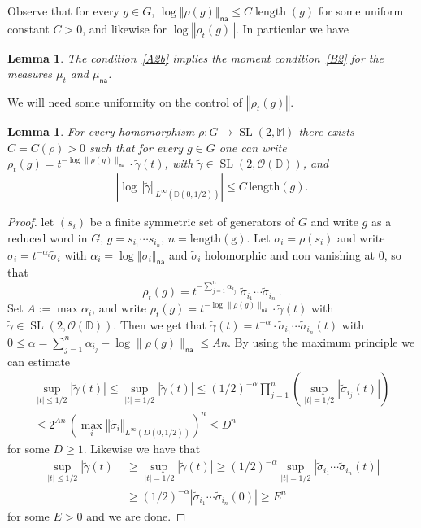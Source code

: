 \documentclass[11pt]{article}
\newtheorem{lemm}[theo]{Lemma}
\theoremstyle{definition}
\numberwithin{equation}{section}
\numberwithin{figure}{section}
\numberwithin{table}{section}
\DeclareMathOperator{\length}{length}
\DeclareMathOperator{\SL}{SL}
\newcommand{\cO}{\mathcal{O}}
\newcommand{\mm}{\mathbb{M}}
\newcommand{\D}{\mathbb{D}}
\newcommand{\norm}[1]{\left\Vert#1\right\Vert}
\newcommand{\abs}[1]{\left\vert#1\right\vert}
\newcommand{\lrpar}[1]{\left(#1\right)}
\newcommand{\na}{\mathsf{na}}
\begin{document}
Observe that for every $g\in G$, $\log \norm{\rho(g)}_\na\leq C \length (g)$ for some uniform constant $C>0$, and likewise for $\log\norm{\rho_t(g)}$. In particular we have

\begin{lemm}\label{lem:AtoB}
The condition~\eqref{A2b} implies the moment condition~\eqref{B2} for the measures $\mu_t$ and $\mu_\na$.
\end{lemm}

We will need some uniformity on the control of $\norm{\rho_t(g)}$.

\begin{lemm}\label{lem:uniform disk}
For every homomorphism $\rho: G\to \SL(2, \mm)$ there exists $C = C(\rho)>0$ such that for every $g\in G$ one can write $\rho_t(g) = t^{-\log\|\rho(g) \|_\na}\cdot \widetilde{\gamma}(t)$, with $\widetilde{\gamma}\in \SL(2,\cO(\D))$, and
\begin{equation}\label{eq:uniform disk}
\abs{\log\norm{\widetilde \gamma}_{L^{\infty}(\overline{\D}(0,1/2))} }\leq C\, \mathrm{length}(g).
\end{equation}
\end{lemm}

\begin{proof}
let $(s_i)$ be a finite symmetric set of generators of $G$ and write $g$ as a reduced word in $G$, $g = s_{i_1}\cdots s_{i_n}$, $n = \mathrm{length(g)}$. Let $\sigma_i = \rho(s_i)$ and write $\sigma_i = t^{-\alpha_i} \widetilde \sigma_i$ with $\alpha_i = \log\norm{\sigma_i}_\na$ and $\widetilde \sigma_i$ holomorphic and non vanishing at 0,
so that
\[
\rho_t(g)= t^{-\sum_{j=1}^n\alpha_{i_j}} \; \widetilde \sigma_{i_1}\cdots \widetilde \sigma_{i_n}~.
\]
Set $A:= \max \alpha_i$, and write $\rho_t(g) = t^{-\log\|\rho(g) \|_\na}\cdot \widetilde{\gamma}(t)$ with $\widetilde{\gamma} \in \SL(2, \cO(\D))$. Then we get that $\widetilde{\gamma}(t) = t^{-\alpha} \cdot \widetilde \sigma_{i_1}\cdots \widetilde \sigma_{i_n}(t)$ with $0\le \alpha = \sum_{j=1}^n\alpha_{i_j} - \log\|\rho(g) \|_\na \le An$. By using the maximum principle we can estimate
\begin{multline*}
\sup_{|t|\le1/2}|\widetilde{\gamma}(t)| \le \sup_{|t|=1/2} |\widetilde{\gamma}(t)| \le (1/2)^{-\alpha} \prod_{j=1}^n \lrpar {\sup_{|t|=1/2} \abs{\widetilde \sigma_{i_j}(t) }}\\
\le 2^{An} \, \left(\max_{i}\norm{ \widetilde \sigma_i}_{L^\infty(D(0, 1/2))} \right)^n\le D^n
\end{multline*}
for some $D\geq1$. Likewise we have that
\begin{align*}
\sup_{|t|\le1/2}|\widetilde{\gamma}(t)| &\ge \sup_{|t|=1/2} |\widetilde{\gamma}(t)|
\ge (1/2)^{-\alpha} \sup_{|t|=1/2} \abs{\widetilde \sigma_{i_1}\cdots \widetilde \sigma_{i_n}(t)}\\
&\ge (1/2)^{-\alpha} \abs{\widetilde \sigma_{i_1}\cdots \widetilde \sigma_{i_n}(0)} \ge E^n
\end{align*}
for some $E>0$ and we are done.
\end{proof}
\end{document}
